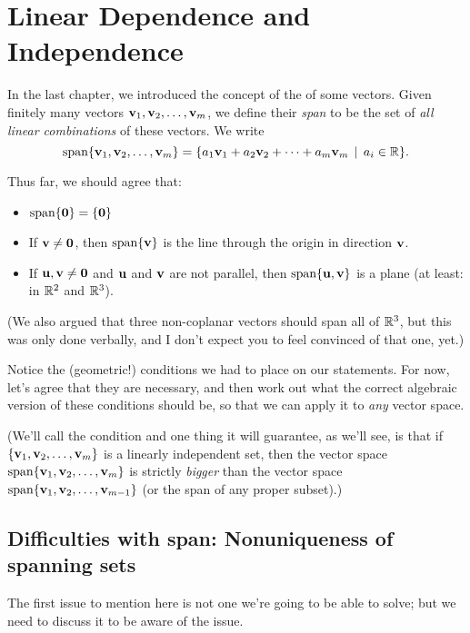 \chapter{Linear Dependence and Independence}\label{Chapter:07independence}



In the last chapter, we introduced the concept of the  of some
vectors.  Given finitely many vectors $\mathbf{v}_1, \mathbf{v}_2, \ldots, \mathbf{v}_m$,
we define their \emph{span} to be the set of \emph{all linear
combinations} of these vectors.  We write
$$
\textrm{span}\{ \mathbf{v}_1, \mathbf{v}_2, \ldots, \mathbf{v}_m\} = \{ a_1\mathbf{v}_1 + a_2\mathbf{v}_2 + \cdots + a_m\mathbf{v}_m \,\mid \, a_i \in \mathbb{R}\}.
$$

Thus far, we should agree that:
\begin{itemize}
\item $\textrm{span}\{\mathbf{0}\} = \{ \mathbf{0}\}$
\item If $\mathbf{v} \neq \mathbf{0}$, then $\textrm{span}\{ \mathbf{v} \}$ is the line through the
origin in direction $\mathbf{v}$.
\item If $\mathbf{u}, \mathbf{v} \neq \mathbf{0}$ and $\mathbf{u}$ and $\mathbf{v}$ are not parallel, then
$\textrm{span}\{\mathbf{u},\mathbf{v}\}$ is a plane (at least: in $\mathbb{R}^2$ and $\mathbb{R}^3$).
\end{itemize}
(We also argued that three non-coplanar vectors should span all of $\mathbb{R}^3$,
but this was only done verbally, and I don't expect 
you to feel convinced of that one, yet.)

Notice the (geometric!) conditions we had to place on our statements.  For now,
let's agree that they are necessary, and then work out what the
correct algebraic version of these conditions should be, so that
we can apply it to \emph{any} vector space.

(We'll call the condition
 and one thing it will guarantee, as we'll
see, is that if $\{ \mathbf{v}_1, \mathbf{v}_2, \ldots, \mathbf{v}_m\}$ is a linearly
independent set, then the vector space $\textrm{span}\{\mathbf{v}_1, \mathbf{v}_2, \ldots, \mathbf{v}_m\}$ is 
strictly \emph{bigger} than the vector space $\textrm{span}\{\mathbf{v}_1, \mathbf{v}_2, \ldots, \mathbf{v}_{m-1}\}$
(or the span of any proper subset).)

\section[Difficulties with span, I]{Difficulties with span: Nonuniqueness of spanning sets}

The first issue to mention here is not one we're going to be able to
solve; but we need to discuss it to be aware of the issue.  

